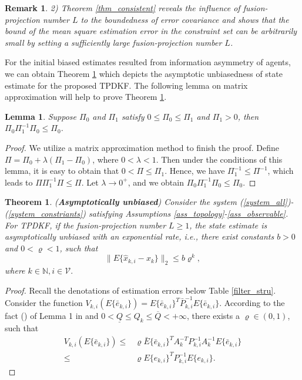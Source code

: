 \documentclass[journal,transmag]{IEEEtran}
\newtheorem{remark}{\textbf{Remark}}
\newtheorem{theorem}{\textbf{Theorem}}
\newtheorem{lemma}{\textbf{Lemma}}
\begin{document}
{\begin{remark}
	2) Theorem \ref{thm_consistent} reveals the influence of fusion-projection number $L$ to the  boundedness of error covariance and shows that the bound of the mean square estimation error in the constraint set can be  arbitrarily small by setting a sufficiently large fusion-projection number $L$.
\end{remark}
For the initial biased estimates resulted from information asymmetry of agents,  we can obtain Theorem \ref{thm_noisefree} which depicts the asymptotic unbiasedness of state estimate for the proposed TPDKF. The following lemma on matrix approximation will help to prove Theorem \ref{thm_noisefree}.
\begin{lemma}\label{lem_ineq}
	Suppose $\varPi_{0}$ and $\varPi_{1}$ satisfy  $0\leq\varPi_{0}\leq \varPi_{1}$ and $\varPi_{1}>0$, then  $\varPi_{0}\varPi_{1}^{-1}\varPi_{0}\leq\varPi_{0}$.
\end{lemma}
\begin{proof}
	We utilize a matrix approximation method to finish the proof.
	Define $\varPi=\varPi_{0}+\lambda(\varPi_{1}-\varPi_{0})$, where $0<\lambda<1$. Then under the conditions of this lemma, it is easy to obtain that $0<\varPi\leq \varPi_{1}$. Hence, we have $\varPi_{1}^{-1}\leq \varPi^{-1}$, which leads to $\varPi\varPi_{1}^{-1}\varPi\leq \varPi$. Let $\lambda\rightarrow 0^+$, and we  obtain 
$\varPi_{0}\varPi_{1}^{-1}\varPi_{0}\leq\varPi_{0}$.	
\end{proof}



\begin{theorem}\label{thm_noisefree}
			(\textbf{Asymptotically unbiased}) Consider the system (\ref{system_all})-(\ref{system_constriants}) satisfying Assumptions  \ref{ass_topology}-\ref{ass_observable}. For TPDKF, if the fusion-projection number $L\geq1$, 
the state estimate is asymptotically unbiased with an exponential rate, i.e., there exist constants $b>0$ and $0<\varrho<1$, such that
	\begin{equation}\label{zero_covergence}
	\|E\{\hat x_{k,i}-x_{k}\}\|_2\leq b\varrho^k,  
	\end{equation}
	where $ k\in\mathbb{N}, i\in \mathcal{V}.$
\end{theorem}
\begin{proof}
	Recall the denotations of estimation errors below Table \ref{filter_stru}.
	Consider the function $V_{k,i}(E\{\bar e_{k,i}\})=E\{\bar e_{k,i}\}^T\bar P_{k,i}^{-1}E\{\bar e_{k,i}\}$.
	According to the fact (\expandafter{}) of Lemma 1 in \cite{Battistelli2014Kullback} and  $0<\underline Q\leq Q_{k}\leq \overline Q<+\infty$, there exists a $\varrho\in(0,1)$, such that
	\begin{equation}\label{iteration_V1}
	\begin{split}
	V_{k,i}(E\{\bar e_{k,i}\})\leq& \varrho\bar E\{\bar e_{k,i}\}^TA_{k}^{-T}P_{k,i}^{-1}A_{k}^{-1}E\{\bar e_{k,i}\}\\
	\leq& \varrho E\{ e_{k,i}\}^TP_{k,i}^{-1}E\{ e_{k,i}\}.
	\end{split}
	\end{equation}


\end{proof}}
\end{document}

